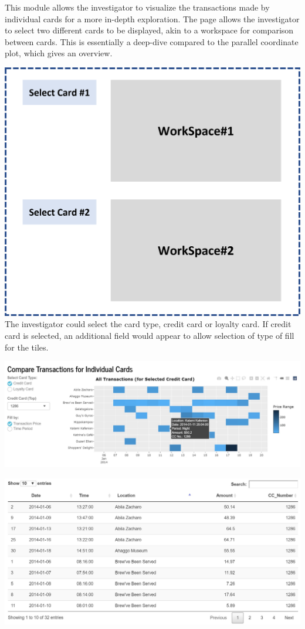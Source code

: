 \documentclass{acm_proc_article-sp}
\begin{document}
This module allows the investigator to visualize the transactions made
by individual cards for a more in-depth exploration. The page allows the
investigator to select two different cards to be displayed, akin to a
workspace for comparison between cards. This is essentially a deep-dive
compared to the parallel coordinate plot, which gives an overview.

\includegraphics{img/P06WorkSpace.png} The investigator could select the
card type, credit card or loyalty card. If credit card is selected, an
additional field would appear to allow selection of type of fill for the
tiles.

\includegraphics{img/P02SpecCard.jpg}

\includegraphics{img/P05SpecCardTable.jpg}
\end{document}
